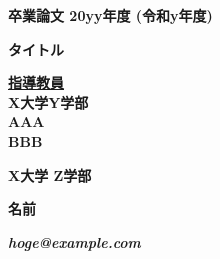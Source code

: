 \pagestyle{empty}

\begin{center}

  \vspace{5cm}
  
  \textbf{\Large 卒業論文 20yy年度 (令和y年度)}
  
  \vspace{2cm}
  
  \textbf{\LARGE タイトル}
  
  \vspace{3cm}
  
  \textbf{\underline{\large 指導教員}}\\
  \textbf{X大学Y学部}\\
  \vspace{0.5cm}
  \textbf{\Large AAA}\\
  \textbf{\Large BBB}\\
  
  \vspace{5cm}
  
  \textbf{\LARGE X大学 \LARGE Z学部}
  
  \vspace{.5em}
  
  \textbf{\LARGE 名前}
  
  \vspace{.3em}
  
  \textbf{\it hoge@example.com}
  
  
  
  \newpage
  
\end{center}

\pagestyle{plain}

